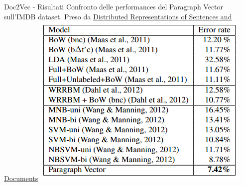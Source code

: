 \documentclass[british]{beamer}
\begin{document}
\begin{frame}{Doc2Vec - Risultati}
	Confronto delle performances del Paragraph Vector sull'IMDB dataset.
	Preso da \href{https://cs.stanford.edu/~quocle/paragraph_vector.pdf}{Distributed Representations of Sentences and Documents}
	\centering
	\includegraphics[width = 0.5\linewidth]{./Imgs/d2v-results.png}
\end{frame}
\end{document}
